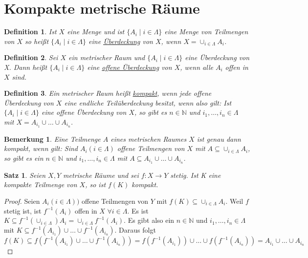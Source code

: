 \documentclass[10pt,a4paper]{report}
\newtheorem{satz}{Satz}
\newtheorem*{defi}{Definition}
\newtheorem*{remark}{Bemerkung}
\begin{document}
\section{Kompakte metrische Räume}

\begin{defi}
  Ist $X$ eine Menge und ist $\{ A_{i} \mid i \in \Lambda \}$ eine Menge von Teilmengen von $X$ so heißt $\{ A_{i} \mid i \in \Lambda \}$ eine \underline{Überdeckung} von $X$, wenn $X = \cup_{i \in \Lambda} A_{i}$.
\end{defi}

\begin{defi}
  Sei $X$ ein metrischer Raum und $\{ A_{i} \mid i \in \Lambda \}$ eine Überdeckung von X.
  Dann heißt $\{ A_{i} \mid i \in \Lambda \}$ eine \underline{offene Überdeckung} von $X$, wenn alle $A_{i}$ offen in $X$ sind.
\end{defi}

\begin{defi}
  Ein metrischer Raum heißt \underline{kompakt}, wenn jede offene Überdeckung von $X$ eine endliche Teilüberdeckung besitzt, wenn also gilt:
  Ist $\{ A_{i} \mid i \in \Lambda \}$ eine offene Überdeckung von $X$, so gibt es $n \in \mathbb{N}$ und $i_{1}, \dots, i_{n} \in \Lambda$ mit $X = A_{i_{1}} \cup \dots \cup A_{i_{n}}$.
\end{defi}

\begin{remark}
  Eine Teilmenge $A$ eines metrischen Raumes $X$ ist genau dann kompakt, wenn gilt:
  Sind $A_{i} (i \in \Lambda)$ offene Teilmengen von $X$ mit $A \subseteq \cup_{i \in \Lambda} A_{i}$, so gibt es ein $n \in \mathbb{N}$ und $i_{1}, \dots, i_{n} \in \Lambda$ mit $A \subseteq A_{i_{1}} \cup \dots \cup A_{i_{n}}$.
\end{remark}

\begin{satz}
  Seien $X, Y$ metrische Räume und sei $f : X \rightarrow Y$ stetig.
  Ist K eine kompakte Teilmenge von $X$, so ist $f(K)$ kompakt.
\end{satz}

\begin{proof}
  Seien $A_{i} (i \in \Lambda))$ offene Teilmengen von $Y$ mit $f(K) \subseteq \cup_{i \in \Lambda} A_{i}$.
  Weil $f$ stetig ist, ist $f^{-1}(A_{i})$ offen in $X$ $\forall i \in \Lambda$.
  Es ist $K \subseteq f^{-1}(\cup_{i \in \Lambda}) A_{i} = \cup_{i \in \Lambda} f^{-1}(A_{i})$.
  Es gibt also ein $n \in \mathbb{N}$ und $i_{1}, \dots, i_{n} \in \Lambda$ mit $K \subseteq f^{-1}(A_{i_{1}}) \cup \dots \cup f^{-1}(A_{i_{n}})$.
  Daraus folgt
  \begin{equation}
    f(K) \subseteq f(f^{-1}(A_{i_{1}}) \cup \dots \cup f^{-1}(A_{i_{n}})) = f(f^{-1}(A_{i_{1}})) \cup \dots \cup f(f^{-1}(A_{i_{n}})) = A_{i_{1}} \cup \dots \cup A_{i_{n}}
  \end{equation}
\end{proof}
\end{document}
